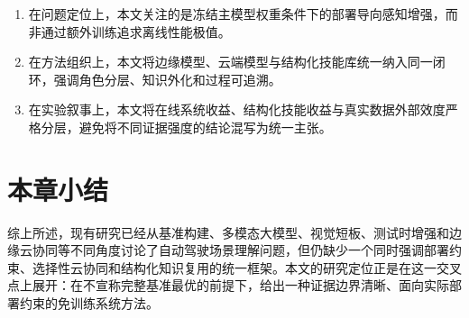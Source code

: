 \begin{enumerate}
  \item 在问题定位上，本文关注的是冻结主模型权重条件下的部署导向感知增强，而非通过额外训练追求离线性能极值。
  \item 在方法组织上，本文将边缘模型、云端模型与结构化技能库统一纳入同一闭环，强调角色分层、知识外化和过程可追溯。
  \item 在实验叙事上，本文将在线系统收益、结构化技能收益与真实数据外部效度严格分层，避免将不同证据强度的结论混写为统一主张。
\end{enumerate}

\section{本章小结}
\label{sec:related-summary}

综上所述，现有研究已经从基准构建、多模态大模型、视觉短板、测试时增强和边缘云协同等不同角度讨论了自动驾驶场景理解问题，但仍缺少一个同时强调部署约束、选择性云协同和结构化知识复用的统一框架。本文的研究定位正是在这一交叉点上展开：在不宣称完整基准最优的前提下，给出一种证据边界清晰、面向实际部署约束的免训练系统方法。
